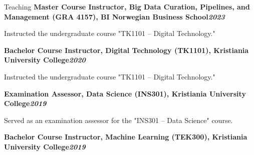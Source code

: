 \begin{rubric}{Teaching}
\entry*[]%
\textbf{Master Course Instructor, Big Data Curation, Pipelines, and Management (GRA 4157), BI Norwegian Business School\hfill\textit{2023}} \par
\begin{compactitem}
    \item Instructed the undergraduate course "TK1101 – Digital Technology."
    \vspace{-12pt}
\end{compactitem}
%
\entry*[]%
\textbf{Bachelor Course Instructor, Digital Technology (TK1101), Kristiania University College\hfill\textit{2020}} \par
\begin{compactitem}
    \item Instructed the undergraduate course "TK1101 – Digital Technology."
    \vspace{-12pt}
\end{compactitem}
%
\entry*[]%
\textbf{Examination Assessor, Data Science (INS301), Kristiania University College\hfill\textit{2019}} \par
\begin{compactitem}
    \item Served as an examination assessor for the "INS301 – Data Science" course.
    \vspace{-12pt}
\end{compactitem}
%
\entry*[]%
\textbf{Bachelor Course Instructor, Machine Learning (TEK300), Kristiania University College\hfill\textit{2019}} \par

\end{rubric}
